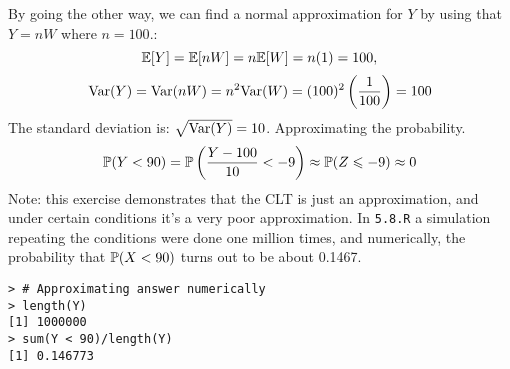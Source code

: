 \newpage\noindent
By going the other way, we can find a normal approximation for $Y$ by using that $Y = nW$
where $n=100$.:
$$
\E[Y] = \E[nW] = n\E[W] = n(1) = 100,
$$
$$
\V(Y) = \V(nW) = n^2\V(W) = (100)^2\left(\frac{1}{100}\right) = 100
$$
The standard deviation is: $\sqrt{\V(Y)} = 10$. Approximating the probability.
$$
\P(Y < 90) = \P\left(\frac{Y - 100}{10} < -9\right) \approx \P(Z\leq -9) \approx 0
$$
Note: this exercise demonstrates that the CLT is just an approximation,
and under certain conditions it's a very poor approximation. In \texttt{5.8.R}
a simulation repeating the conditions were done one million times, and numerically,
the probability that $\P(X < 90)$ turns out to be about 0.1467.
\begin{lstlisting}[style=RSyntax, title=R]
> # Approximating answer numerically
> length(Y)
[1] 1000000
> sum(Y < 90)/length(Y)
[1] 0.146773
\end{lstlisting}











